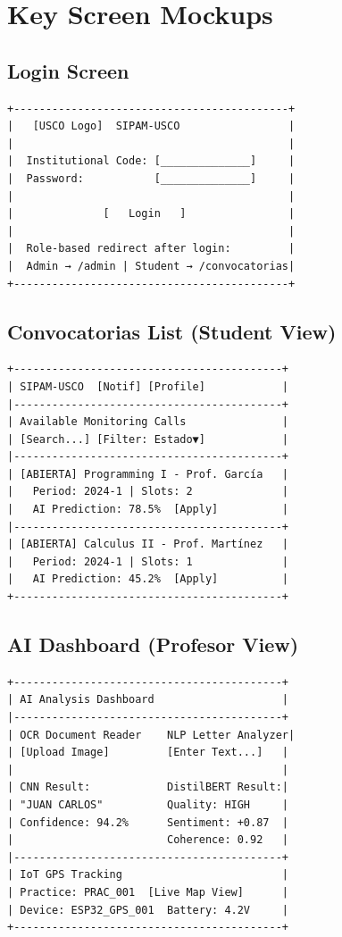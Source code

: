 \documentclass[12pt,a4paper]{report}
\begin{document}
\section{Key Screen Mockups}

\subsection{Login Screen}
\begin{lstlisting}
+-------------------------------------------+
|   [USCO Logo]  SIPAM-USCO                 |
|                                           |
|  Institutional Code: [______________]     |
|  Password:           [______________]     |
|                                           |
|              [   Login   ]                |
|                                           |
|  Role-based redirect after login:         |
|  Admin → /admin | Student → /convocatorias|
+-------------------------------------------+
\end{lstlisting}

\subsection{Convocatorias List (Student View)}
\begin{lstlisting}
+------------------------------------------+
| SIPAM-USCO  [Notif] [Profile]            |
|------------------------------------------+
| Available Monitoring Calls               |
| [Search...] [Filter: Estado▼]            |
|------------------------------------------+
| [ABIERTA] Programming I - Prof. García   |
|   Period: 2024-1 | Slots: 2              |
|   AI Prediction: 78.5%  [Apply]          |
|------------------------------------------+
| [ABIERTA] Calculus II - Prof. Martínez   |
|   Period: 2024-1 | Slots: 1              |
|   AI Prediction: 45.2%  [Apply]          |
+------------------------------------------+
\end{lstlisting}

\subsection{AI Dashboard (Profesor View)}
\begin{lstlisting}
+------------------------------------------+
| AI Analysis Dashboard                    |
|------------------------------------------+
| OCR Document Reader    NLP Letter Analyzer|
| [Upload Image]         [Enter Text...]   |
|                                          |
| CNN Result:            DistilBERT Result:|
| "JUAN CARLOS"          Quality: HIGH     |
| Confidence: 94.2%      Sentiment: +0.87  |
|                        Coherence: 0.92   |
|------------------------------------------+
| IoT GPS Tracking                         |
| Practice: PRAC_001  [Live Map View]      |
| Device: ESP32_GPS_001  Battery: 4.2V     |
+------------------------------------------+
\end{lstlisting}
\end{document}
